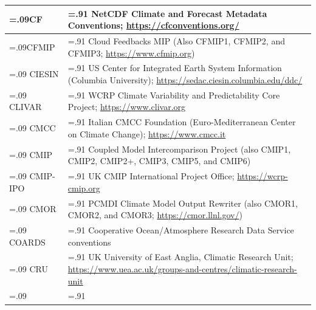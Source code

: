 \documentclass[manuscript]{copernicus}
\begin{document}
\begin{table}[htp]
{\begin{tabularx}{1\textwidth} { 
	  | >{\raggedright\arraybackslash\hsize=.09\hsize}X
	  | >{\centering\arraybackslash\hsize=.91\hsize}X | }
CF & NetCDF Climate and Forecast Metadata Conventions; \url{https://cfconventions.org/}\\ \hline
CFMIP & Cloud Feedbacks MIP (Also CFMIP1, CFMIP2, and CFMIP3; \url{https://www.cfmip.org})\\ \hline
CIESIN & US Center for Integrated Earth System Information (Columbia University); \url{https://sedac.ciesin.columbia.edu/ddc/}\\ \hline
CLIVAR & WCRP Climate Variability and Predictability Core Project; \url{https://www.clivar.org}\\ \hline
CMCC & Italian CMCC Foundation (Euro-Mediterranean Center on Climate Change); \url{https://www.cmcc.it}\\ \hline
CMIP & Coupled Model Intercomparison Project (also CMIP1, CMIP2, CMIP2+, CMIP3, CMIP5, and CMIP6)\\ \hline
CMIP-IPO & UK CMIP International Project Office; \url{https://wcrp-cmip.org}\\ \hline
CMOR & PCMDI Climate Model Output Rewriter (also CMOR1, CMOR2, and CMOR3; \url{https://cmor.llnl.gov/})\\ \hline
COARDS & Cooperative Ocean/Atmosphere Research Data Service conventions\\ \hline
CRU & UK University of East Anglia, Climatic Research Unit; \url{https://www.uea.ac.uk/groups-and-centres/climatic-research-unit}\\ \hline
\multicolumn{2}{l}{\textbf{\autoref{tab:tabAppG1-Acronyms} continued overpage..}}\\
\end{tabularx}
} %
\label{tab:tabAppG1-Acronyms}
\end{table}
\end{document}
